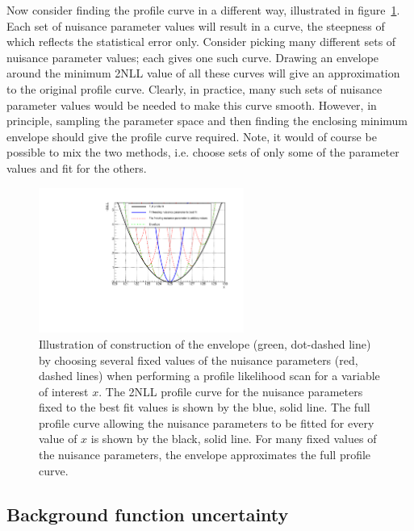 Now consider finding the profile curve in a different way, illustrated
in figure~\ref{fig:concept:cartoon}.
Each set of nuisance
parameter values will result in a curve, the steepness of which reflects 
the statistical error only. Consider picking many different sets of nuisance
parameter values; each gives one such curve. Drawing an envelope around the
minimum 2NLL value of all these curves will give an approximation to the
original profile curve. Clearly, in practice, many such sets of nuisance
parameter values would be needed to make this curve smooth. However, in
principle, sampling the parameter space and then finding the enclosing
minimum envelope should give the profile curve required.
Note, it would of course be possible to mix the two methods, i.e.
choose sets of only some of the parameter values and fit for the others.
%
\begin{figure}[tbp]
\centering
\includegraphics[width=0.6\textwidth]{concept/envelope_cartoon.pdf}
\caption{Illustration of construction of the envelope (green, dot-dashed line)
by choosing several fixed values of the nuisance parameters (red, dashed lines)
when performing a profile likelihood scan for a variable of interest $x$.
The 2NLL profile curve for the nuisance parameters fixed to the best fit
values is shown by the blue, solid line. The full profile curve allowing the
nuisance parameters to be fitted for every value of $x$ is shown by the 
black, solid line. For many fixed values of the nuisance parameters,
the envelope approximates the full profile curve.}
\label{fig:concept:cartoon}
\end{figure}

\subsection{Background function uncertainty}
\label{sec:concept:functions}

